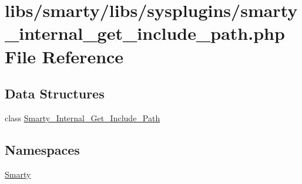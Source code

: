 \hypertarget{smarty__internal__get__include__path_8php}{}\section{libs/smarty/libs/sysplugins/smarty\+\_\+internal\+\_\+get\+\_\+include\+\_\+path.php File Reference}
\label{smarty__internal__get__include__path_8php}
\subsection*{Data Structures}
\begin{DoxyCompactItemize}
\item 
class \hyperlink{class_smarty___internal___get___include___path}{Smarty\+\_\+\+Internal\+\_\+\+Get\+\_\+\+Include\+\_\+\+Path}
\end{DoxyCompactItemize}
\subsection*{Namespaces}
\begin{DoxyCompactItemize}
\item 
 \hyperlink{namespace_smarty}{Smarty}
\end{DoxyCompactItemize}
